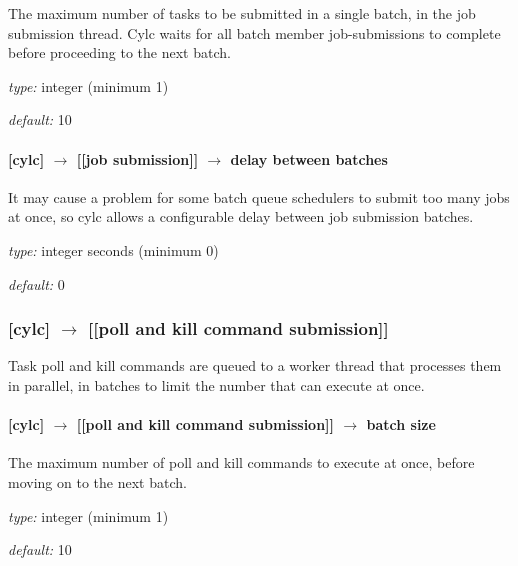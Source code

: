 The maximum number of tasks to be submitted in a single batch, in the
job submission thread. Cylc waits for all batch member job-submissions
to complete before proceeding to the next batch.

\begin{myitemize}
    \item {\em type:} integer (minimum 1)
    \item {\em default:} 10
\end{myitemize}

\paragraph[delay between batches]{[cylc] $\rightarrow$ [[job submission]] $\rightarrow$ delay between batches}

It may cause a problem for some batch queue schedulers to submit too
many jobs at once, so cylc allows a configurable delay between job 
submission batches.

\begin{myitemize}
    \item {\em type:} integer seconds (minimum 0)
    \item {\em default:} 0
\end{myitemize}

\subsubsection[{[[}poll and kill command submission{]]}]{[cylc] $\rightarrow$ [[poll and kill command submission]]}

Task poll and kill commands are queued to a worker thread that processes
them in parallel, in batches to limit the number that can execute at
once.

\paragraph[batch size]{[cylc] $\rightarrow$ [[poll and kill command submission]] $\rightarrow$ batch size}

The maximum number of poll and kill commands to execute at once, before
moving on to the next batch.

\begin{myitemize}
    \item {\em type:} integer (minimum 1)
    \item {\em default:} 10
\end{myitemize}

